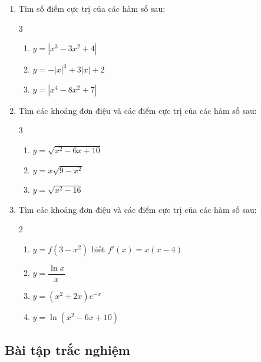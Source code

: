 \documentclass[12pt]{article}
\begin{document}
	\begin{btdo}
		
		\begin{enumerate}[label=\textbf{Bài \arabic*.}]
			\item  Tìm số điểm cực trị của các hàm số sau:
			\begin{multicols}{3}
				\begin{enumerate}[label=\alph*)]
					\item $y = |x^3 - 3x^2 + 4|$
					\item $y = -|x|^3 + 3|x| + 2$
					\item $y = |x^4 - 8x^2 + 7|$
				\end{enumerate}
			\end{multicols}
			
			\item Tìm các khoảng đơn điệu và các điểm cực trị của các hàm số sau:
			\begin{multicols}{3}
				\begin{enumerate}[label=\alph*)]
					\item $y = \sqrt{x^2 - 6x + 10}$
					\item $y = x\sqrt{9 - x^2}$
					\item $y = \sqrt{x^2 - 16}$
				\end{enumerate}
			\end{multicols}
			
			\item Tìm các khoảng đơn điệu và các điểm cực trị của các hàm số sau:
			\begin{multicols}{2}
				\begin{enumerate}[label=\alph*)]
					\item $y = f(3 - x^2)$ biết $f'(x) = x(x - 4)$
					\item $y = \dfrac{\ln x}{x}$
					\item $y = (x^2 + 2x)e^{-x}$
					\item $y = \ln(x^2 - 6x + 10)$
				\end{enumerate}
			\end{multicols}
		\end{enumerate}
	\end{btdo}
	
	
	\subsection{Bài tập trắc nghiệm}
	
\end{document}
